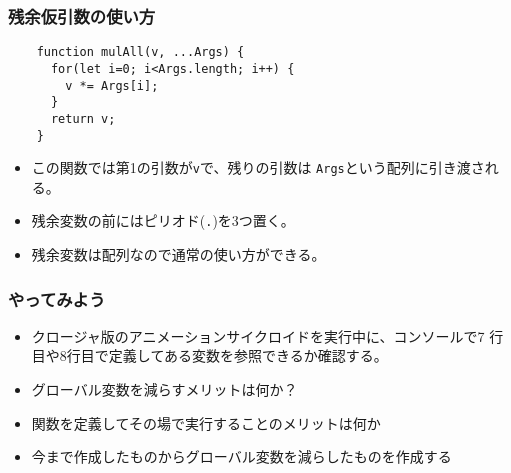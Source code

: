 \begin{frame}[containsverbatim]
 \frametitle{残余仮引数の使い方}
	\begin{Verbatim}
	function mulAll(v, ...Args) {
	  for(let i=0; i<Args.length; i++) {
	    v *= Args[i];
	  }
	  return v;
	}
	\end{Verbatim}
\begin{itemize}
 \item この関数では第1の引数が\texttt{v}で、残りの引数は
			 \texttt{Args}という配列に引き渡される。
 \item 残余変数の前にはピリオド(\texttt{.})を3つ置く。
 \item 残余変数は配列なので通常の使い方ができる。
 \end{itemize}
\end{frame}
\begin{frame}[containsverbatim]
 \frametitle{やってみよう}
 \begin{itemize}
	\item クロージャ版のアニメーションサイクロイドを実行中に、コンソールで7
				行目や8行目で定義してある変数を参照できるか確認する。
	\item グローバル変数を減らすメリットは何か？
	\item 関数を定義してその場で実行することのメリットは何か
	\item 今まで作成したものからグローバル変数を減らしたものを作成する
 \end{itemize}
\end{frame}


\begin{frame}[containsverbatim]
 \frametitle{}
\end{frame}
